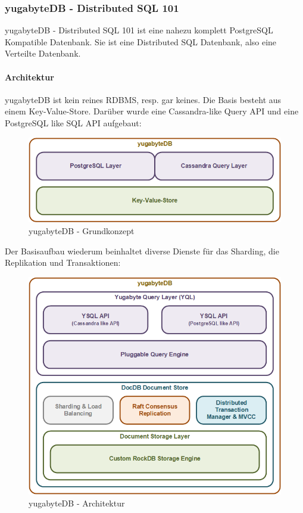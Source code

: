 
\begin{flushleft}
    \subsubsection{yugabyteDB - Distributed SQL 101}
    yugabyteDB - Distributed SQL 101 ist eine nahezu komplett \Gls{PostgreSQL} Kompatible Datenbank.
    Sie ist eine Distributed SQL Datenbank, also eine Verteilte Datenbank\cite{ZXD6D9KU}.
\end{flushleft}
\begin{flushleft}
    \paragraph{Architektur}
    yugabyteDB ist kein reines \Gls{RDBMS}, resp. gar keines.
    Die Basis besteht aus einem \Gls{Key-Value-Store}.
    Darüber wurde eine \Gls{Cassandra}-like Query API und eine PostgreSQL like SQL API aufgebaut:
    \begin{figure}[H]
        \centering
        \includegraphics[width=0.8\linewidth]{source/implementation/evaluation/postgresql_ha_solutions/yugabytedb/yugabytedb-concept}
        \caption{yugabyteDB - Grundkonzept}
        \label{fig:yugabytedb-concept}
    \end{figure}
\end{flushleft}
\begin{flushleft}
    Der Basisaufbau wiederum beinhaltet diverse Dienste für das Sharding, die Replikation und Transaktionen:
    \begin{figure}[H]
        \centering
        \includegraphics[width=0.8\linewidth]{source/implementation/evaluation/postgresql_ha_solutions/yugabytedb/yugabytedb-basic-archicture}
        \caption{yugabyteDB - Architektur}
        \label{fig:yugabytedb-basic-archicture}
    \end{figure}
\end{flushleft}
